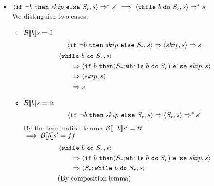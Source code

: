 \begin{exercise}
\begin{itemize}
\begin{itemize}
\begin{itemize}
                \end{itemize}
            \end{itemize}
        \item $\instr{\texttt{if}\ \neg b\ \texttt{then}\ skip\ \texttt{else}\ S_r}{s} \Rightarrow^* s' \implies \instr{\texttt{while}\ b\ \texttt{do}\ S_r}{s} \Rightarrow^* s$ \\
            We distinguish two cases:
            \begin{itemize}
                \item $\mathcal{B} \llbracket  b \rrbracket s = \text{ff}$
                \begin{gather*}
                    \instr{\texttt{if}\ \neg b\ \texttt{then}\ skip\ \texttt{else}\ S_r}{s}
                    \Rightarrow
                    \instr{skip}{s}
                    \Rightarrow s
                    \\
                    \begin{align*}
                        &\instr{\texttt{while}\ b\ \texttt{do}\ S_r}{s}
                        \\&\qquad\Rightarrow \instr{\texttt{if}\ b\ \texttt{then} (S_r; \texttt{while}\ b\ \texttt{do}\ S_r)\ \texttt{else}\ skip}{s}
                        \\&\qquad\Rightarrow \instr{skip}{s}
                        \\&\qquad\Rightarrow s
                    \end{align*}
                \end{gather*}
                \item $\mathcal{B} \llbracket  b \rrbracket s = \text{tt}$
                \[
                    \instr{\texttt{if}\ \neg b\ \texttt{then}\ skip\ \texttt{else}\ S_r}{s}
                    \Rightarrow
                    \instr{S_r}{s}
                    \Rightarrow^* s'
                \]
                By the termination lemma $\mathcal{B} \llbracket  \neg b \rrbracket s' = tt$ \\
                $\implies \mathcal{B} \llbracket  b \rrbracket s' = ff$
                \begin{align*}
                    &\instr{\texttt{while}\ b\ \texttt{do}\ S_r}{s}
                    \\&\qquad\Rightarrow \instr{\texttt{if}\ b\ \texttt{then} (S_r; \texttt{while}\ b\ \texttt{do}\ S_r)\ \texttt{else}\ skip}{s}
                    \\&\qquad\Rightarrow \instr{S_r; \texttt{while}\ b\ \texttt{do}\ S_r}{s}
                    \\&\text{(By composition lemma)}

\end{align*}
\end{itemize}
\end{itemize}
\end{exercise}
